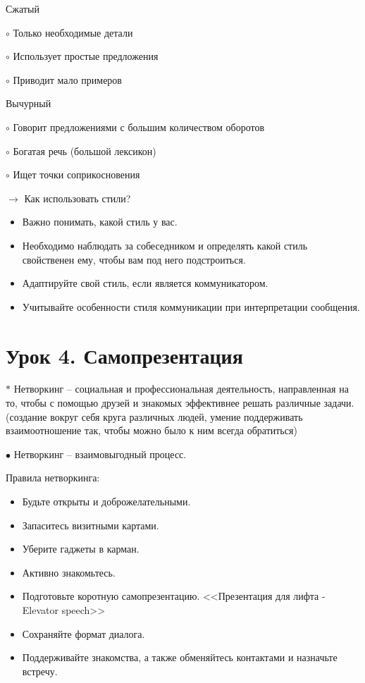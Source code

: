 \documentclass[12pt,a4paper]{report}
\begin{document}
\bigskip
\begin{minipage}{0.45\textwidth}
	{\large Сжатый}
	
	\smallskip
	$\circ$ Только необходимые детали
	
	$\circ$ Использует простые предложения
	
	$\circ$ Приводит мало примеров
\end{minipage}
\hfill
\begin{minipage}{0.45\textwidth}
	{\large Вычурный}
	
	\smallskip
	$\circ$ Говорит предложениями с большим количеством оборотов
	
	$\circ$ Богатая речь (большой лексикон)
	
	$\circ$ Ищет точки соприкосновения
\end{minipage}

\bigskip
$\rightarrow$ Как использовать стили?
\begin{itemize}
	\item Важно понимать, какой стиль у вас.
	\item Необходимо наблюдать за собеседником и определять какой стиль свойственен ему, чтобы вам под него подстроиться.
	\item Адаптируйте свой стиль, если является коммуникатором.
	\item Учитывайте особенности стиля коммуникации при интерпретации сообщения.
\end{itemize}

\newpage
\section*{Урок 4. Самопрезентация}
$\ast$ Нетворкинг -- социальная и профессиональная деятельность, направленная на то, чтобы с помощью друзей и знакомых эффективнее решать различные задачи. (создание вокруг себя круга различных людей, умение поддерживать взаимоотношение так, чтобы можно было к ним всегда обратиться)

\medskip
$\bullet$ Нетворкинг -- взаимовыгодный процесс.

\bigskip
Правила нетворкинга:
\begin{itemize}
	\item Будьте открыты и доброжелательными.
	\item Запаситесь визитными картами.
	\item Уберите гаджеты в карман.
	\item Активно знакомьтесь.
	\item Подготовьте коротную самопрезентацию. <<Презентация для лифта - Elevator speech>>
	\item Сохраняйте формат диалога.
	\item Поддерживайте знакомства, а также обменяйтесь контактами и назначьте встречу.
\end{itemize}
\end{document}
